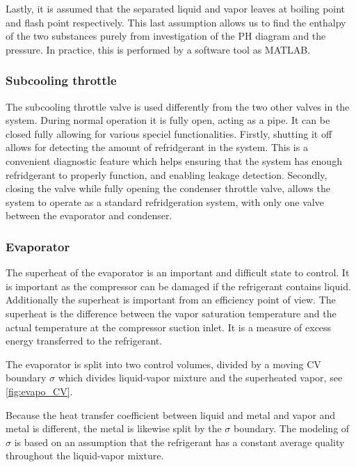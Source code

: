 Lastly, it is assumed that the separated liquid and vapor leaves at boiling point and flash point respectively. This last assumption allows us to find the enthalpy of the two substances purely from investigation of the PH diagram and the pressure. In practice, this is performed by a software tool as MATLAB.

\subsubsection{Subcooling throttle}
The subcooling throttle valve is used differently from the two other valves in the system. During normal operation it is fully open, acting as a pipe. It can be closed fully allowing for various speciel functionalities. Firstly, shutting it off allows for detecting the amount of refridgerant in the system. This is a convenient diagnostic feature which helps ensuring that the system has enough refridgerant to properly function, and enabling leakage detection. Secondly, closing the valve while fully opening the condenser throttle valve, allows the system to operate as a standard refridgeration system, with only one valve between the evaporator and condenser.

\subsubsection{Evaporator}
The superheat of the evaporator is an important and difficult state to control. It is important as the compressor can be damaged if the refrigerant contains liquid. Additionally the superheat is important from an efficiency point of view. 
The superheat is the difference between the vapor saturation temperature and the actual temperature at the compressor suction inlet. It is a measure of excess energy transferred to the refrigerant. 

The evaporator is split into two control volumes, divided by a moving CV boundary $\sigma$ which divides liquid-vapor mixture and the superheated vapor, see \cref{fig:evapo_CV}.

Because the heat transfer coefficient between liquid and metal and vapor and metal is different, the metal is likewise split by the $\sigma$ boundary. The modeling of $\sigma$ is based on an assumption that the refrigerant has a constant average quality throughout the liquid-vapor mixture.

